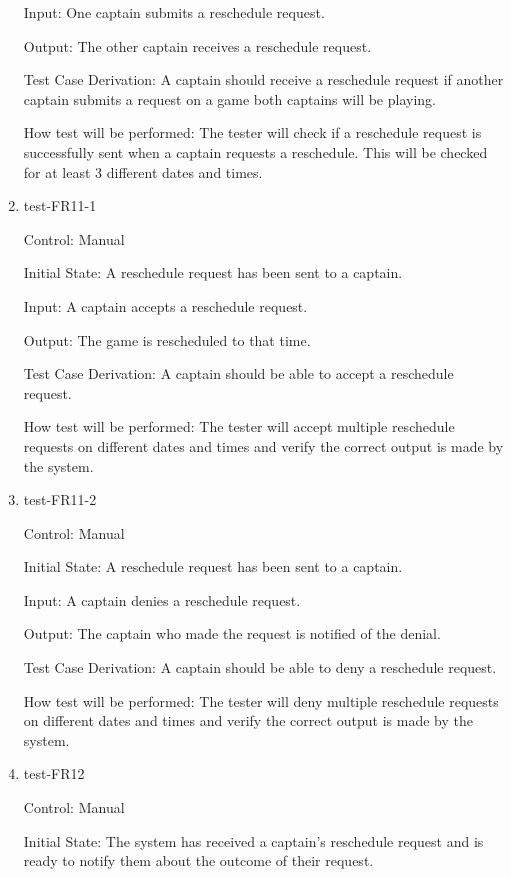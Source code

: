 \documentclass[12pt, titlepage]{article}
\begin{document}
\begin{enumerate}
  Input: One captain submits a reschedule request.

  Output: The other captain receives a reschedule request.

  Test Case Derivation: A captain should receive a reschedule request if another
  captain submits a request on a game both captains will be playing.

  How test will be performed: The tester will check if a reschedule request is
  successfully sent when a captain requests a reschedule. This will be checked
  for at least 3 different dates and times.

  \item{test-FR11-1\\}

  Control: Manual

  Initial State: A reschedule request has been sent to a captain.

  Input: A captain accepts a reschedule request.

  Output: The game is rescheduled to that time.

  Test Case Derivation: A captain should be able to accept a reschedule
  request.

  How test will be performed: The tester will accept multiple reschedule
  requests on different dates and times and verify the correct output is made by
  the system.

  \item{test-FR11-2\\}

  Control: Manual

  Initial State: A reschedule request has been sent to a captain.

  Input: A captain denies a reschedule request.

  Output: The captain who made the request is notified of the denial.

  Test Case Derivation: A captain should be able to deny a reschedule
  request.

  How test will be performed: The tester will deny multiple reschedule
  requests on different dates and times and verify the correct output is made by
  the system.

  \item{test-FR12\\}

  Control: Manual

  Initial State: The system has received a captain's reschedule request and is ready to
  notify them about the outcome of their request.


\end{enumerate}
\end{document}
